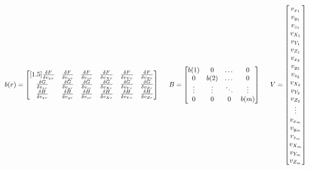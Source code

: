 \[
b(r) = 
\begin{bmatrix}[1.5]
\frac{\delta F}{\delta v_{xr}} & \frac{\delta F}{\delta v_{yr}} & \frac{\delta F}{\delta v_{zr}} & \frac{\delta F}{\delta v_{Xr}} & \frac{\delta F}{\delta v_{Yr}} & \frac{\delta F}{\delta v_{Zr}} \\
\frac{\delta G}{\delta v_{xr}} & \frac{\delta G}{\delta v_{yr}} & \frac{\delta G}{\delta v_{zr}} & \frac{\delta G}{\delta v_{Xr}} & \frac{\delta G}{\delta v_{Yr}} & \frac{\delta G}{\delta v_{Zr}} \\
\frac{\delta H}{\delta v_{xr}} & \frac{\delta H}{\delta v_{yr}} & \frac{\delta H}{\delta v_{zr}} & \frac{\delta H}{\delta v_{Xr}} & \frac{\delta H}{\delta v_{Yr}} & \frac{\delta H}{\delta v_{Zr}}
\end{bmatrix}
\hspace{0.5cm}
B = 
\begin{bmatrix}
b(1) & 0 & \dots & 0 \\
0 & b(2) & \dots & 0 \\
\vdots & \vdots & \ddots & \vdots \\
0 & 0 & 0 & b(m) \\
\end{bmatrix}
\hspace{0.5cm}
V = 
\begin{bmatrix}
v_{x_1} \\
v_{y_1} \\
v_{z_1} \\
v_{X_1} \\
v_{Y_1} \\
v_{Z_1} \\
v_{x_2} \\
v_{y_2} \\
v_{z_2} \\
v_{X_2} \\
v_{Y_2} \\
v_{Z_2} \\
\vdots \\
v_{x_m} \\
v_{y_m} \\
v_{z_m} \\
v_{X_m} \\
v_{Y_m} \\
v_{Z_m}
\end{bmatrix}
\]
